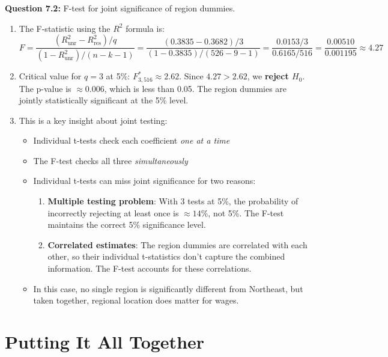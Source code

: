 \documentclass[11pt,letterpaper]{article}
\begin{document}
\textbf{Question 7.2:} F-test for joint significance of region dummies.

\begin{answer}
\begin{enumerate}[label=(\alph*)]
\item The F-statistic using the $R^2$ formula is:
\[
F = \frac{(R^2_{\text{unr}} - R^2_{\text{res}}) / q}{(1 - R^2_{\text{unr}}) / (n - k - 1)} = \frac{(0.3835 - 0.3682) / 3}{(1 - 0.3835) / (526 - 9 - 1)} = \frac{0.0153 / 3}{0.6165 / 516} = \frac{0.00510}{0.001195} \approx 4.27
\]

\item Critical value for $q = 3$ at 5\%: $F_{3,516}^* \approx 2.62$. Since $4.27 > 2.62$, we \textbf{reject $H_0$}. The p-value is $\approx 0.006$, which is less than 0.05. The region dummies are jointly statistically significant at the 5\% level.

\item This is a key insight about joint testing:
\begin{itemize}[noitemsep]
\item Individual t-tests check each coefficient \textit{one at a time}
\item The F-test checks all three \textit{simultaneously}
\item Individual t-tests can miss joint significance for two reasons:
  \begin{enumerate}
  \item \textbf{Multiple testing problem}: With 3 tests at 5\%, the probability of incorrectly rejecting at least once is $\approx 14\%$, not 5\%. The F-test maintains the correct 5\% significance level.
  \item \textbf{Correlated estimates}: The region dummies are correlated with each other, so their individual t-statistics don't capture the combined information. The F-test accounts for these correlations.
  \end{enumerate}
\item In this case, no single region is significantly different from Northeast, but taken together, regional location does matter for wages.
\end{itemize}
\end{enumerate}
\end{answer}

\newpage

\section{Putting It All Together}
\end{document}
